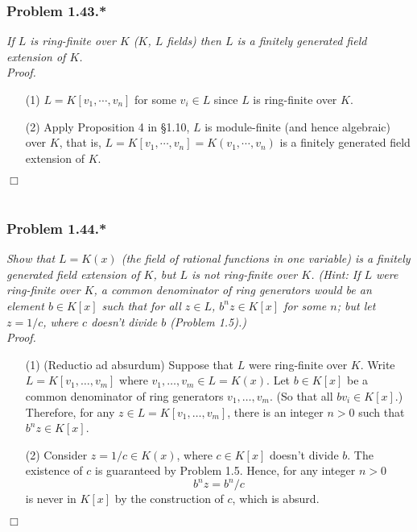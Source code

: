 \documentclass{article}
\begin{document}



\subsubsection*{Problem 1.43.*}
\emph{If $L$ is ring-finite over $K$ ($K$, $L$ fields)
then $L$ is a finitely generated field extension of $K$.} \\

\emph{Proof.}
\begin{enumerate}
\item[(1)]
  $L = K[v_1, \cdots, v_n]$ for some $v_i \in L$ since $L$ is ring-finite over $K$.

\item[(2)]
  Apply Proposition 4 in \S 1.10,
  $L$ is module-finite (and hence algebraic) over $K$,
  that is, $L = K[v_1, \cdots, v_n] = K(v_1, \cdots, v_n)$
  is a finitely generated field extension of $K$.
\end{enumerate}
$\Box$ \\\\






\subsubsection*{Problem 1.44.*}
\emph{Show that $L = K(x)$ (the field of rational functions in one variable)
is a finitely generated field extension of $K$, but $L$ is not ring-finite over $K$.
(Hint: If $L$ were ring-finite over $K$,
a common denominator of ring generators would be an element $b \in K[x]$ such that
for all $z \in L$, $b^n z \in K[x]$ for some $n$;
but let $z = 1/c$, where $c$ doesn't divide $b$ (Problem 1.5).)} \\

\emph{Proof.}
\begin{enumerate}
\item[(1)]
  (Reductio ad absurdum)
  Suppose that $L$ were ring-finite over $K$.
  Write $L = K[v_1,\ldots,v_m]$
  where $v_1,\ldots,v_m \in L = K(x)$.
  Let $b \in K[x]$ be a common denominator of ring generators $v_1, \ldots, v_m$.
  (So that all $bv_i \in K[x]$.)
  Therefore, for any $z \in L = K[v_1,\ldots,v_m]$, there is an integer $n > 0$
  such that $b^n z \in K[x]$.

\item[(2)]
  Consider $z = 1/c \in K(x)$, where $c \in K[x]$ doesn't divide $b$.
  The existence of $c$ is guaranteed by Problem 1.5.
  Hence, for any integer $n > 0$
  \[
    b^n z = b^n/c
  \]
  is never in $K[x]$ by the construction of $c$, which is absurd.
\end{enumerate}
$\Box$ \\\\
\end{document}

